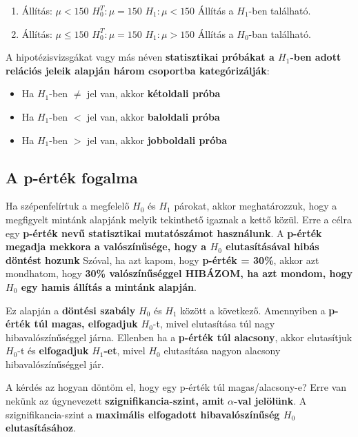 \documentclass[
]{book}
\providecommand{\tightlist}{%
  \setlength{\itemsep}{0pt}\setlength{\parskip}{0pt}}
\begin{document}
\begin{enumerate}
\def\labelenumi{\arabic{enumi}.}
\tightlist
\item
  Állítás: \(\mu < 150\) \textbar\textbar{} \(H_0^T:\mu = 150\) \textbar\textbar{} \(H_1:\mu < 150\) \textbar\textbar{} Állítás a \(H_1\)-ben található.
\item
  Állítás: \(\mu \leq 150\) \textbar\textbar{} \(H_0^T:\mu = 150\) \textbar\textbar{} \(H_1:\mu > 150\) \textbar\textbar{} Állítás a \(H_0\)-ban található.
\end{enumerate}

A hipotézisvizsgákat vagy más néven \textbf{statisztikai próbákat a \(H_1\)-ben adott relációs jeleik alapján három csoportba kategórizálják}:

\begin{itemize}
\tightlist
\item
  Ha \(H_1\)-ben \(\neq\) jel van, akkor \textbf{kétoldali próba}
\item
  Ha \(H_1\)-ben \(<\) jel van, akkor \textbf{baloldali próba}
\item
  Ha \(H_1\)-ben \(>\) jel van, akkor \textbf{jobboldali próba}
\end{itemize}

\subsection{A p-érték fogalma}\label{a-p-uxe9rtuxe9k-fogalma}

Ha szépenfelírtuk a megfelelő \(H_0\) és \(H_1\) párokat, akkor meghatározzuk, hogy a megfigyelt mintánk alapjánk melyik tekinthető igaznak a kettő közül. Erre a célra egy \textbf{p-érték nevű statisztikai mutatószámot használunk}. A \textbf{p-érték megadja mekkora a valószínűsége, hogy a \(H_0\) elutasításával hibás döntést hozunk}
Szóval, ha azt kapom, hogy \textbf{p-érték = 30\%}, akkor azt mondhatom, hogy \textbf{30\% valószínűséggel HIBÁZOM, ha azt mondom, hogy \(H_0\) egy hamis állítás a mintánk alapján}.

Ez alapján a \textbf{döntési szabály} \(H_0\) és \(H_1\) között a következő. Amennyiben a \textbf{p-érték túl magas, elfogadjuk} \(H_0\)-t, mivel elutasítása túl nagy hibavalószínűséggel járna. Ellenben ha a \textbf{p-érték túl alacsony}, akkor elutasítjuk \(H_0\)-t és \textbf{elfogadjuk} \(H_1\)\textbf{-et}, mivel \(H_0\) elutasítása nagyon alacsony hibavalószínűséggel jár.

A kérdés az hogyan döntöm el, hogy egy p-érték túl magas/alacsony-e? Erre van nekünk az úgynevezett \textbf{szignifikancia-szint, amit} \(\alpha\)\textbf{-val jelölünk}. A szignifikancia-szint a \textbf{maximális elfogadott hibavalószínűség \(H_0\) elutasításához}.
\end{document}
